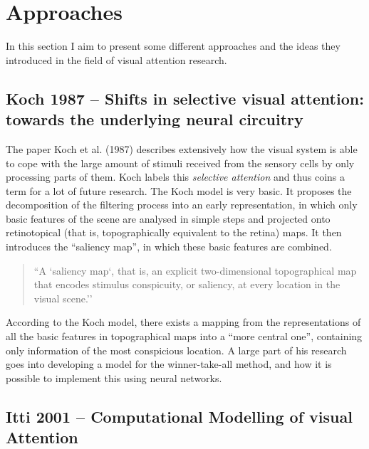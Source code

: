 \documentclass[a4paper,12pt,fleqn,oneside]{scrartcl}
\begin{document}
\section{Approaches}

In this section I aim to present some different approaches and the ideas they
introduced in the field of visual attention research. 

\subsection{Koch 1987 -- Shifts in selective visual attention: towards the underlying neural circuitry}

The paper Koch et al. (1987) describes extensively how the visual
system is able to cope with the large amount of stimuli received from the
sensory cells by only processing parts of them. Koch labels this \emph{selective
attention} and thus coins a term for a lot of future research. The Koch model is
very basic. It proposes the decomposition of the filtering process into an early
representation, in which only basic features of the scene are analysed in simple
steps and projected onto retinotopical (that is,  topographically equivalent to
the retina) maps. It then introduces the ``saliency map'', in which these basic
features are combined.

    \begin{quote}
    ``A `saliency map`, that is, an explicit two-dimensional topographical map that
    encodes stimulus conspicuity, or saliency, at every location in the visual
    scene.''\cite{itti2001}
    \end{quote}

According to the Koch model, there exists a mapping from the representations of all the basic  features in topographical maps into
a ``more central one'', containing only information of the most conspicious location.  A large part of his research goes
into developing a model for the winner-take-all method, and how it is possible to implement this using neural networks.

\subsection{Itti 2001 -- Computational Modelling of visual Attention}
\end{document}
